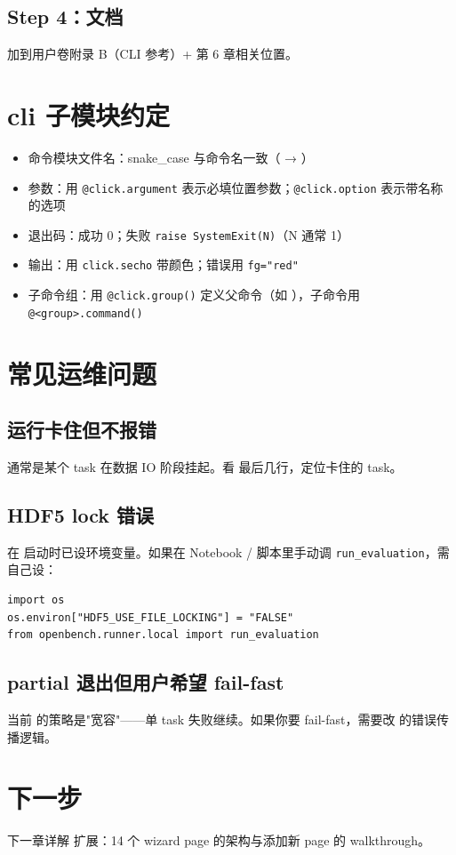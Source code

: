 \subsection{Step 4：文档}

加到用户卷附录 B（CLI 参考）+ 第 6 章相关位置。

\section{cli 子模块约定}

\begin{itemize}
  \item 命令模块文件名：snake\_case 与命令名一致（ → ）
  \item 参数：用 \texttt{@click.argument} 表示必填位置参数；\texttt{@click.option} 表示带名称的选项
  \item 退出码：成功 0；失败 \texttt{raise SystemExit(N)}（N 通常 1）
  \item 输出：用 \texttt{click.secho} 带颜色；错误用 \texttt{fg="red"}
  \item 子命令组：用 \texttt{@click.group()} 定义父命令（如 ），子命令用 \texttt{@<group>.command()}
\end{itemize}

\section{常见运维问题}

\subsection{运行卡住但不报错}

通常是某个 task 在数据 IO 阶段挂起。看  最后几行，定位卡住的 task。

\subsection{HDF5 lock 错误}

\openbench{} 在  启动时已设环境变量。如果在 Notebook / 脚本里手动调 \texttt{run\_evaluation}，需自己设：

\begin{verbatim}
import os
os.environ["HDF5_USE_FILE_LOCKING"] = "FALSE"
from openbench.runner.local import run_evaluation
\end{verbatim}

\subsection{partial 退出但用户希望 fail-fast}

当前 \openbench{} 的策略是"宽容"——单 task 失败继续。如果你要 fail-fast，需要改  的错误传播逻辑。

\section{下一步}

下一章详解  扩展：14 个 wizard page 的架构与添加新 page 的 walkthrough。
